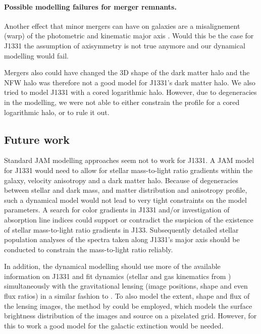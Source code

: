 \paragraph{Possible modelling failures for merger remnants.} Another effect that minor mergers can have on galaxies are a misalignement (warp) of the photometric and kinematic major axis \Wilma{[TO DO: REF]}. Would this be the case for J1331 the assumption of axisymmetry is not true anymore and our dynamical modelling would fail.

Mergers also could have changed the 3D shape of the dark matter halo and the NFW halo was therefore not a good model for J1331's dark matter halo. We also tried to model J1331 with a cored logarithmic halo. However, due to degeneracies in the modelling, we were not able to either constrain the profile for a cored logarithmic halo, or to rule it out. 



\subsection{Future work}

Standard JAM modelling approaches seem not to work for J1331. A JAM model for J1331 would need to allow for stellar mass-to-light ratio gradients within the galaxy, velocity anisotropy and a dark matter halo. Because of degeneracies between stellar and dark mass, and matter distribution and anisotropy profile, such a dynamical model would not lead to very tight constraints on the model parameters.  A search for color gradients in J1331 and/or investigation of absorption line indices could support or contradict the suspicion of the existence of stellar mass-to-light ratio gradients in J133. Subsequently detailed stellar population analyses of the spectra taken along J1331's major axis should be conducted to constrain the mass-to-light ratio reliably.  

In addition, the dynamical modelling should use more of the available information on J1331 and fit dynamics (stellar and gas kinematics from \citet{SWELLSV}) simultaneously with the gravitational lensing (image positions, shape and even flux ratios) in a similar fashion to \citet{SWELLSIV}. To also model the extent, shape and flux of the lensing images, the method by \citet{2004ApJ...611..739T,2003ApJ...590..673W} could be employed, which models the surface brightness distribution of the images and source on a pixelated grid. However, for this to work a good model for the galactic extinction would be needed. 

